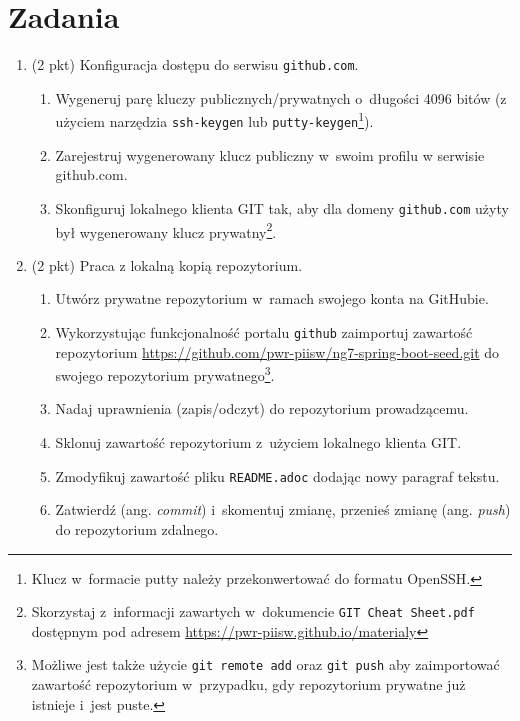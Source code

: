 \documentclass[12pt]{article}
\begin{document}
    \section*{Zadania}
    \begin{enumerate}
        \item\label{exc:github-access}
            (2 pkt) Konfiguracja dostępu do serwisu \texttt{github.com}.
            \begin{enumerate}
                \item Wygeneruj parę kluczy publicznych/prywatnych o~długości 4096 bitów (z użyciem narzędzia \texttt{ssh-keygen} lub \texttt{putty-keygen}\footnote{Klucz w~formacie putty należy przekonwertować do formatu OpenSSH.}).
                \item Zarejestruj wygenerowany klucz publiczny w~swoim profilu w serwisie github.com.
                \item Skonfiguruj lokalnego klienta GIT tak, aby dla domeny \texttt{github.com} użyty był wygenerowany klucz prywatny\footnote{Skorzystaj z~informacji zawartych w~dokumencie \texttt{GIT Cheat Sheet.pdf} dostępnym pod adresem \url{https://pwr-piisw.github.io/materialy}}.
            \end{enumerate}

        \item\label{exc:git-repo}
            (2 pkt) Praca z lokalną kopią repozytorium.
            \begin{enumerate}
                \item Utwórz prywatne repozytorium w~ramach swojego konta na GitHubie.
                \item Wykorzystując funkcjonalność portalu \texttt{github} zaimportuj zawartość repozytorium \url{https://github.com/pwr-piisw/ng7-spring-boot-seed.git} do swojego repozytorium prywatnego\footnote{Możliwe jest także użycie \texttt{git remote add} oraz \texttt{git push} aby zaimportować zawartość repozytorium w~przypadku, gdy repozytorium prywatne już istnieje i~jest puste.}.
                \item Nadaj uprawnienia (zapis/odczyt) do repozytorium prowadzącemu.
                \item Sklonuj zawartość repozytorium z~użyciem lokalnego klienta GIT.
                \item Zmodyfikuj zawartość pliku \texttt{README.adoc} dodając nowy paragraf tekstu.
                \item Zatwierdź (ang. \textit{commit}) i~skomentuj zmianę, przenieś zmianę (ang. \textit{push}) do repozytorium zdalnego.
            \end{enumerate}


\end{enumerate}
\end{document}
